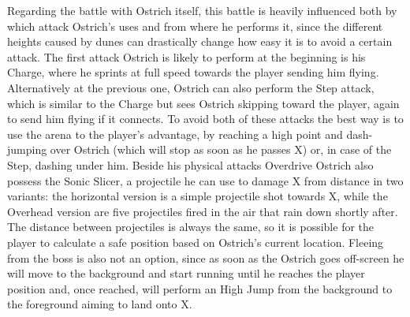 Regarding the battle with Ostrich itself, this battle is heavily influenced both by which attack Ostrich's uses and from where he performs it, since the different heights caused by dunes can drastically change how easy it is to avoid a certain attack. The first attack Ostrich is likely to perform at the beginning is his Charge, where he sprints at full speed towards the player sending him flying. Alternatively at the previous one, Ostrich can also perform the Step attack, which is similar to the Charge but sees Ostrich skipping toward the player, again to send him flying if it connects. To avoid both of these attacks the best way is to use the arena to the player's advantage, by reaching a high point and dash-jumping over Ostrich (which will stop as soon as he passes X) or, in case of the Step, dashing under him. Beside his physical attacks Overdrive Ostrich also possess the Sonic Slicer, a projectile he can use to damage X from distance in two variants: the horizontal version is a simple projectile shot towards X, while the Overhead version are five projectiles fired in the air that rain down shortly after. The distance between projectiles is always the same, so it is possible for the player to calculate a safe position based on Ostrich's current location. Fleeing from the boss is also not an option, since as soon as the Ostrich goes off-screen he will move to the  background and start running until he reaches the player position and, once reached, will perform an High Jump from the background to the foreground aiming to land onto X.

